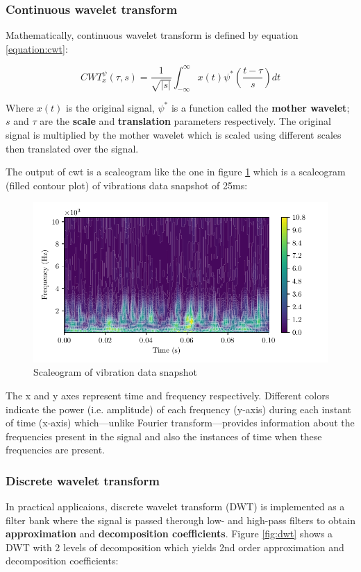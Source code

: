 \subsubsection{Continuous wavelet transform}
Mathematically, continuous wavelet transform is defined by equation \ref{equation:cwt}:

\begin{equation}
    CWT_x^\psi(\tau, s)=\frac{1}{\sqrt{|s|}}\int_{-\infty}^{\infty}x(t)\psi^* \left(\frac{t-\tau}{s}\right)dt
    \label{equation:cwt}
\end{equation}

Where $x(t)$ is the original signal, $\psi^*$ is a function called the \textbf{mother wavelet}; $s$ and $\tau$ are the \textbf{scale} and \textbf{translation} parameters respectively. The original signal is multiplied by the mother wavelet which is scaled using different scales then translated over the signal.

The output of \acrshort{cwt} is a scaleogram like the one in figure \ref{fig:scaleogram} which is a scaleogram (filled contour plot) of vibrations data snapshot of 25ms:

\begin{figure}[H]
    \centering
    \includegraphics{figures/scaleogram.pdf}
    \caption{Scaleogram of vibration data snapshot}
    \label{fig:scaleogram}
\end{figure}

The x and y axes represent time and frequency respectively. Different colors indicate the power (i.e. amplitude) of each frequency (y-axis) during each instant of time (x-axis) which—unlike Fourier transform—provides information about the frequencies present in the signal and also the instances of time when these frequencies are present.

\subsubsection{Discrete wavelet transform}%
\label{subsub:discrete_wavelet_transform}
In practical applicaions, discrete wavelet transform (DWT) is implemented as a filter bank where the signal is passed therough low- and high-pass filters to obtain \textbf{approximation} and \textbf{decomposition coefficients}. Figure \ref{fig:dwt} shows a DWT with 2 levels of decomposition which yields 2nd order approximation and decomposition coefficients:

